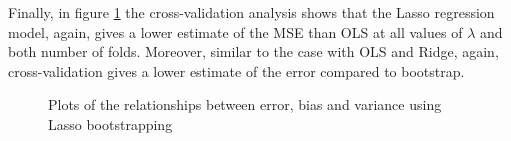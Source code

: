\documentclass{article}
\begin{document}
Finally, in figure \ref{Lassobootstrap} the cross-validation analysis shows that the Lasso regression model, again, gives a lower estimate of the MSE than OLS at all values of $\lambda$ and both number of folds. Moreover, similar to the case with OLS and Ridge, again, cross-validation gives a lower estimate of the error compared to bootstrap.
\begin{figure}[h]\centering
{}\hfill
{} \par
{}\hfill
{}\par
\caption{Plots of the relationships between error, bias and variance using Lasso bootstrapping}
\label{Lassobootstrap}
\end{figure}
\end{document}
